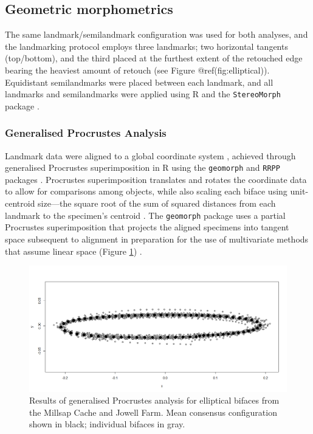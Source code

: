 \documentclass[]{interact}
\theoremstyle{plain}%
\theoremstyle{definition}
\theoremstyle{remark}
\begin{document}
\hypertarget{geometric-morphometrics}{%
\subsection{Geometric morphometrics}\label{geometric-morphometrics}}

The same landmark/semilandmark configuration was used for both analyses,
and the landmarking protocol employs three landmarks; two horizontal
tangents (top/bottom), and the third placed at the furthest extent of
the retouched edge bearing the heaviest amount of retouch (see Figure
@ref(fig:elliptical)). Equidistant semilandmarks were placed between
each landmark, and all landmarks and semilandmarks were applied using R
\citep{R} and the \texttt{StereoMorph} package \citep{RN9091}.

\hypertarget{generalised-procrustes-analysis}{%
\subsubsection{Generalised Procrustes
Analysis}\label{generalised-procrustes-analysis}}

Landmark data were aligned to a global coordinate system
\citep{RN8477,RN7502,RN11622,RN11623,RN11563}, achieved through
generalised Procrustes superimposition \citep{RN11138,RN478,RN1646} in R
using the \texttt{geomorph} and \texttt{RRPP} packages
\citep{RN1655,RN11775,RN11530,RN1774,RN9565}. Procrustes superimposition
translates and rotates the coordinate data to allow for comparisons
among objects, while also scaling each biface using unit-centroid
size---the square root of the sum of squared distances from each
landmark to the specimen's centroid
\citep{RN11139,RN11140,RN11564,RN478}. The \texttt{geomorph} package
uses a partial Procrustes superimposition that projects the aligned
specimens into tangent space subsequent to alignment in preparation for
the use of multivariate methods that assume linear space (Figure
\ref{fig:gpa}) \citep{RN11141,RN11142,RN1646,RN11563}.

\begin{figure}\centering
\includegraphics[width=\linewidth]{figs/gpa.png}
\caption{Results of generalised Procrustes analysis for elliptical bifaces from the Millsap Cache and Jowell Farm. Mean consensus configuration shown in black; individual bifaces in gray.}
\label{fig:gpa}
\end{figure}
\end{document}
